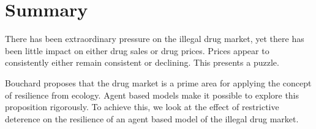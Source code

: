 \documentclass[runningheads,a4paper]{llncs}
\begin{document}






%
%


\section{Summary}

There has been extraordinary pressure on the illegal drug market, yet there has been little impact on either drug sales or drug prices. Prices appear to consistently either remain consistent or declining. This presents a puzzle.

Bouchard proposes that the drug market is a prime area for applying the concept of resilience from ecology. Agent based models make it possible to explore this proposition rigorously. To achieve this, we look at the effect of restrictive deterence on the resilience of an agent based model of the illegal drug market.

{}



\end{document}

